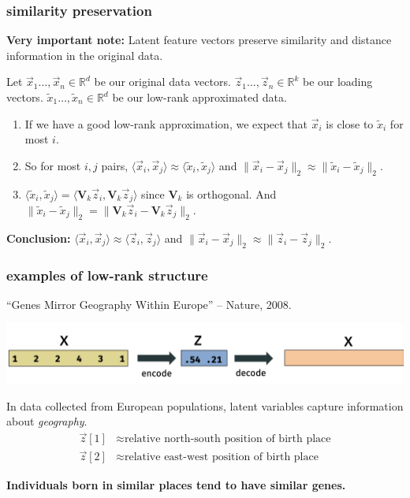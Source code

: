 \documentclass[handout,compress]{beamer}
\newcommand{\bv}[1]{\mathbf{#1}}
\newcommand{\R}{\mathbb{R}}
\begin{document}
\begin{frame}
	\frametitle{similarity preservation}\small
	\textbf{Very important note:} Latent feature vectors preserve similarity and distance information in the original data. 
	
	Let $\vec{x}_1\ldots, \vec{x}_n \in \R^d$ be our original data vectors. $\vec{z}_1\ldots, \vec{z}_n \in\R^k$ be our loading vectors. $\tilde{x}_1\ldots, \tilde{x}_n \in \R^d$ be our low-rank approximated data.
	\begin{enumerate}
		\item If we have a good low-rank approximation, we expect that $\vec{x}_i$ is close to $\tilde{x}_i$ for most $i$. 
		\item So for most $i,j$ pairs, $\langle\vec{x}_i,\vec{x}_j \rangle \approx \langle\tilde{x}_i,\tilde{x}_j \rangle$ and $\|\vec{x}_i - \vec{x}_j\|_2 \approx \|\tilde{x}_i - \tilde{x}_j\|_2$. 
		\item  $\langle\tilde{x}_i,\tilde{x}_j \rangle = \langle\bv{V}_k\vec{z}_i,\bv{V}_k\vec{z}_j \rangle$ since $\bv{V}_k$ is orthogonal. And $\|\tilde{x}_i - \tilde{x}_j\|_2 = \|\bv{V}_k\vec{z}_i - \bv{V}_k\vec{z}_j\|_2$.
	\end{enumerate}
\begin{center}
	\large
	\alert{
	\textbf{Conclusion:} $\langle\vec{x}_i,\vec{x}_j \rangle \approx \langle\vec{z}_i,\vec{z}_j \rangle$ and $\|\vec{x}_i - \vec{x}_j\|_2 \approx \|\vec{z}_i - \vec{z}_j\|_2$.
}
\end{center}

\end{frame}

\begin{frame}
	\frametitle{examples of low-rank structure}
	``Genes Mirror Geography Within Europe'' -- Nature, 2008.
	\begin{center}
		\includegraphics[width=.8\textwidth]{gene_compression.png}
	\end{center}
	In data collected from European populations, latent variables capture information about \emph{geography}. 
\begin{align*}
\vec{z}[1] &\approx \text{relative north-south position of birth place}\\
\vec{z}[2] &\approx \text{relative east-west position of birth place}
\end{align*}
\begin{center}
\textbf{Individuals born in similar places tend to have similar genes.}
\end{center} 
\end{frame}
\end{document}
